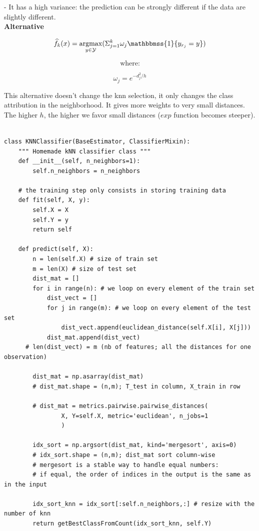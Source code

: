 - It has a high variance: the prediction can be strongly different if the data are slightly different. \\

\textbf{Alternative}

$$\widehat{f}_k(x)=\underset{y \in \mathcal{Y}}{\operatorname{argmax}}(\Sigma_{j=1}^k \omega_j \mathbbmss{1}\{y_{r_j}=y\})$$

$$\text{where:}$$

$$\omega_j = e^{-d_j^2/h}$$

This alternative doesn't change the knn selection, it only changes the class attribution in the neighborhood. It gives more weights to very small distances. The higher $h$, the higher we favor small distances ($exp$ function becomes steeper).

\lstset{language=Python}
\lstset{frame=lines}
\lstset{basicstyle=\footnotesize}
\begin{lstlisting}

class KNNClassifier(BaseEstimator, ClassifierMixin):
    """ Homemade kNN classifier class """
    def __init__(self, n_neighbors=1):
        self.n_neighbors = n_neighbors
    
    # the training step only consists in storing training data
    def fit(self, X, y): 
        self.X = X
        self.Y = y
        return self
    
    def predict(self, X):
        n = len(self.X) # size of train set
        m = len(X) # size of test set
        dist_mat = []
        for i in range(n): # we loop on every element of the train set
            dist_vect = []
            for j in range(m): # we loop on every element of the test set
                dist_vect.append(euclidean_distance(self.X[i], X[j]))
            dist_mat.append(dist_vect) 
	  # len(dist_vect) = m (nb of features; all the distances for one observation)
            
        dist_mat = np.asarray(dist_mat) 
        # dist_mat.shape = (n,m); T_test in column, X_train in row
        
        # dist_mat = metrics.pairwise.pairwise_distances(
				X, Y=self.X, metric='euclidean', n_jobs=1
				)
            
        idx_sort = np.argsort(dist_mat, kind='mergesort', axis=0)  
        # idx_sort.shape = (n,m); dist_mat sort column-wise
        # mergesort is a stable way to handle equal numbers: 
        # if equal, the order of indices in the output is the same as in the input
        
        idx_sort_knn = idx_sort[:self.n_neighbors,:] # resize with the number of knn
        return getBestClassFromCount(idx_sort_knn, self.Y) 

\end{lstlisting}

\vspace{5mm}